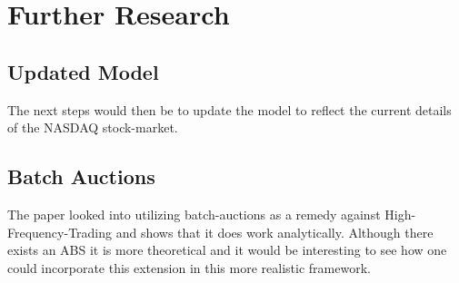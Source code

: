 \section{Further Research}

\subsection{Updated Model}
The next steps would then be to update the model to reflect the current details of the NASDAQ stock-market.

\subsection{Batch Auctions}
The paper \cite{budish_editors_2015} looked into utilizing batch-auctions as a remedy against High-Frequency-Trading and shows that it does work analytically. Although there exists an ABS \cite{wah_latency_2013} it is more theoretical and it would be interesting to see how one could incorporate this extension in this more realistic framework.

